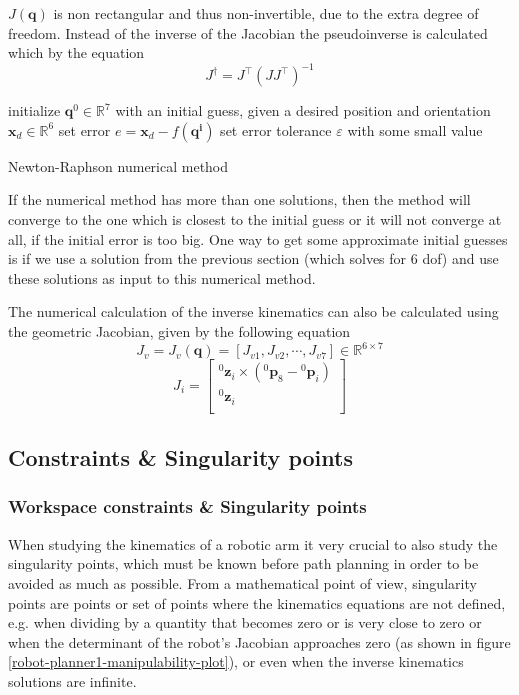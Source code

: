 $J( \mathbf{q} )$ is non rectangular and thus non-invertible, due to the extra degree of freedom. Instead of the inverse of the Jacobian the pseudoinverse is calculated which by the 
equation
\begin{equation}
J^{\dagger} = J^\top ( J J^\top )^{-1}
\end{equation}

\begin{algorithm}[H]
\SetAlgoLined
initialize $\mathbf{q}^0 \in \mathbb{R}^{7}$ with an initial guess, given a desired position and orientation $\mathbf{x}_d \in \mathbb{R}^{6}$\;
set error $e = \mathbf{x}_d - f(\mathbf{q^i})$\;
set error tolerance $ε$ with some small value\;
\caption{Newton-Raphson numerical method}
\end{algorithm}

If the numerical method has more than one solutions, then the method will converge to the one which is closest to the initial guess or it will not converge at all, 
if the initial error is too big. One way to get some approximate initial guesses is if we use a solution from the previous section (which solves for 6 dof) and use these 
solutions as input to this numerical method.

The numerical calculation of the inverse kinematics can also be calculated using the geometric Jacobian, given by the following equation
\[
J_v = J_v( \mathbf{q} ) = [ J_{v1}, J_{v2}, \cdots, J_{v7} ] \in \mathbb{R}^{6 \times 7}
\]
\begin{equation}
J_i = \begin{bmatrix}
{}^0\mathbf{z}_i \times ({}^0\mathbf{p}_8 - {}^0\mathbf{p}_i) \\
{}^0\mathbf{z}_i \\
\end{bmatrix}
\end{equation}


\subsection{Constraints \& Singularity points}

\subsubsection{Workspace constraints \& Singularity points}

When studying the kinematics of a robotic arm it very crucial to also study the singularity points, which must be known before path planning in order to be avoided as much as possible. From a mathematical point of view, 
singularity points are points or set of points where the kinematics equations are not defined, e.g. when dividing by a quantity that becomes zero or is very close to zero or when the determinant of the robot's Jacobian 
approaches zero (as shown in figure \ref{robot-planner1-manipulability-plot}), or even when the inverse kinematics solutions are infinite. \\

